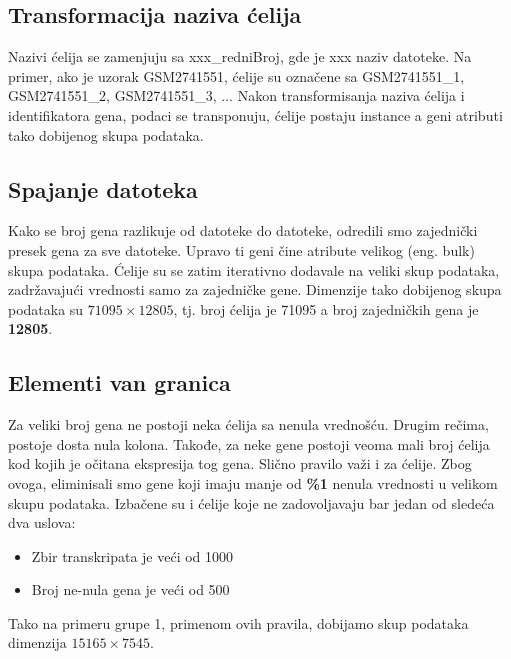 \documentclass[a4paper]{article}
\begin{document}
\subsection{Transformacija naziva ćelija}
Nazivi ćelija se zamenjuju sa xxx\_redniBroj, gde je xxx naziv datoteke. Na primer, ako je uzorak  GSM2741551, ćelije su označene sa GSM2741551\_1,  GSM2741551\_2,  GSM2741551\_3, ...
Nakon transformisanja naziva ćelija i identifikatora gena, podaci se transponuju, ćelije postaju instance a geni atributi tako dobijenog skupa podataka.

\subsection{Spajanje datoteka}
Kako se broj gena razlikuje od datoteke do datoteke, odredili smo zajednički presek gena za sve datoteke. Upravo ti geni čine atribute velikog (eng. bulk) skupa podataka. Ćelije su se zatim iterativno dodavale na veliki skup podataka, zadržavajući vrednosti samo za zajedničke gene. Dimenzije tako dobijenog skupa podataka su $71095 \times 12805$, tj. broj ćelija je 71095 a broj zajedničkih gena je \textbf{12805}.

\subsection{Elementi van granica}
\label{elem_van_granica}
Za veliki broj gena ne postoji neka ćelija sa nenula vrednošću. Drugim rečima, postoje dosta nula kolona. Takođe, za neke gene postoji veoma mali broj ćelija kod kojih je očitana ekspresija tog gena. Slično pravilo važi i za ćelije. Zbog ovoga, eliminisali smo gene koji imaju manje od \textbf{\%1} nenula vrednosti u velikom skupu podataka. Izbačene su i ćelije koje ne zadovoljavaju bar jedan od sledeća dva uslova:
\begin{itemize}
  \item Zbir transkripata je veći od 1000
  \item Broj ne-nula gena je veći od 500
\end{itemize}

Tako na primeru grupe 1, primenom ovih pravila, dobijamo skup podataka dimenzija $15165 \times 7545$.


\end{document}
